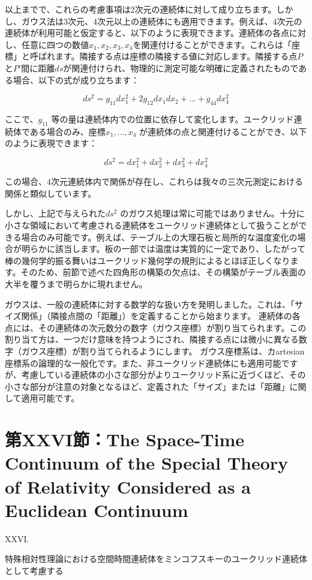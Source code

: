 \documentclass[a4paper,11pt,openany]{ltjsbook}
\begin{document}
以上までで、これらの考慮事項は2次元の連続体に対して成り立ちます。しかし、ガウス法は3次元、4次元以上の連続体にも適用できます。例えば、4次元の連続体が利用可能と仮定すると、以下のように表現できます。連続体の各点に対し、任意に四つの数値$x_1, x_2, x_3, x_4$を関連付けることができます。これらは「座標」と呼ばれます。隣接する点は座標の隣接する値に対応します。隣接する点$P$と$P'$間に距離$ds$が関連付けられ、物理的に測定可能な明確に定義されたものである場合、以下の式が成り立ちます：

\[ ds^2 = g_{11} dx_1^2 + 2 g_{12} dx_1 dx_2 + \dots + g_{44} dx_4^2 \]

ここで、$g_{11}$ 等の量は連続体内での位置に依存して変化します。ユークリッド連続体である場合のみ、座標$x_1, \dots, x_4$ が連続体の点と関連付けることができ、以下のように表現できます：

\[ ds^2 = dx_1^2 + dx_2^2 + dx_3^2 + dx_4^2 \]

この場合、4次元連続体内で関係が存在し、これらは我々の三次元測定における関係と類似しています。

しかし、上記で与えられた$ds^2$ のガウス処理は常に可能ではありません。十分に小さな領域において考慮される連続体をユークリッド連続体として扱うことができる場合のみ可能です。例えば、テーブル上の大理石板と局所的な温度変化の場合が明らかに該当します。板の一部では温度は実質的に一定であり、したがって棒の幾何学的振る舞いはユークリッド幾何学の規則によるとほぼ正しくなります。そのため、前節で述べた四角形の構築の欠点は、その構築がテーブル表面の大半を覆うまで明らかに現れません。

ガウスは、一般の連続体に対する数学的な扱い方を発明しました。これは、「サイズ関係」（隣接点間の「距離」）を定義することから始まります。
連続体の各点には、その連続体の次元数分の数字（ガウス座標）が割り当てられます。この割り当て方は、一つだけ意味を持つようにされ、隣接する点には微小に異なる数字（ガウス座標）が割り当てられるようにします。
ガウス座標系は、カartesian座標系の論理的な一般化です。また、非ユークリッド連続体にも適用可能ですが、考慮している連続体の小さな部分がよりユークリッド系に近づくほど、その小さな部分が注意の対象となるほど、定義された「サイズ」または「距離」に関して適用可能です。


\clearpage
\chapter{第XXVI節：The Space-Time Continuum of the Special Theory of Relativity Considered as a Euclidean Continuum}

XXVI.

特殊相対性理論における空間時間連続体をミンコフスキーのユークリッド連続体として考慮する
\end{document}
